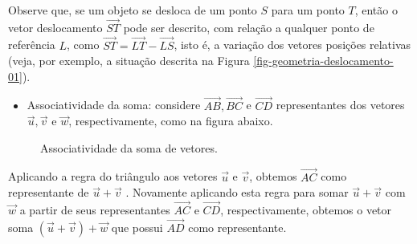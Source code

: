 Observe que, se um objeto se desloca de um ponto \(S\) para um ponto \(T\), então o vetor deslocamento \(\overrightarrow{ST}\) pode ser descrito, com relação a qualquer ponto de referência \(L\), como \(\overrightarrow{ST} = \overrightarrow{LT} - \overrightarrow{LS}\), isto é, a variação dos vetores posições relativas (veja, por exemplo, a situação descrita na Figura 
\ref{fig-geometria-deslocamento-01}).
\begin{itemize}
\item {} 
Associatividade da soma: considere \(\overrightarrow{AB}, \overrightarrow{BC}\) e \(\overrightarrow{CD}\) representantes dos vetores \(\vec{u}, \vec{v}\) e \(\vec{w}\), respectivamente, como na figura abaixo.

\end{itemize}
\begin{figure}[H]
\centering
{} 
 \caption{Associatividade da soma de vetores.} \label{fig-geometria-operacoesvetores-13} 
 \end{figure}
Aplicando a regra do triângulo aos vetores \(\vec{u}\) e  \(\vec{v}\), obtemos \(\overrightarrow{AC}\) como representante de \(\vec{u} + \vec{v}\) . Novamente aplicando esta regra para somar \(\vec{u} + \vec{v}\) com \(\vec{w}\) a partir de seus representantes \(\overrightarrow{AC}\) e \(\overrightarrow{CD}\), respectivamente, obtemos o vetor soma \((\vec{u} + \vec{v})+\vec{w}\) que possui \(\overrightarrow{AD}\) como representante.

